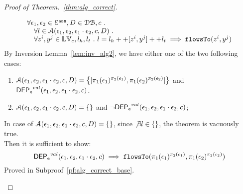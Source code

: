 \begin{proof}[Proof of Theorem.~\ref{thm:alg_correct}]
\begin{case}
\[\begin{array}{l}
  \forall \mathtt{\epsilon}_1, \mathtt{\epsilon}_2 \in \mathcal{E}^{\mathtt{{asn}}}, D \in \mathcal{DB} , c ~.~
  \\ \quad 
   \forall l \in \mathcal{A}( \mathtt{\epsilon}_1, \mathtt{\epsilon}_2,  \mathtt{\epsilon}_1 \cdot \mathtt{\epsilon}_2, c, D) ~.~
   \\ \quad 
   \forall z^i, y^j \in \mathbb{LV}_c, l_h, l_t ~.~ 
   l = l_h ++ [z^i, y^j] ++ l_t 
   \implies \mathtt{flowsTo}(z^i, y^j)
\end{array}
\]
%
By Inversion Lemma~\ref{lem:inv_alg2}, we have either one of the two following cases:
\begin{enumerate}
  \item $\mathcal{A}(\event_1, \event_2, \event_1 \cdot \event_2, c, D) = 
  \left\{[\pi_1(\event_1)^{\pi_2(\event_1)}, \pi_1(\event_2)^{\pi_2(\event_2)}] \right \}$ 
  and $\mathsf{DEP_{\mathtt{e}}}^{val}(\mathtt{\epsilon}_1, \mathtt{\epsilon}_2, \mathtt{\epsilon}_1 \cdot \mathtt{\epsilon}_2, c)$.
  \item  $\mathcal{A}(\mathtt{\epsilon}_1, \mathtt{\epsilon}_2, \mathtt{\epsilon}_1 \cdot \mathtt{\epsilon}_2, c, D) = \{\}$ 
  and $\neg \mathsf{DEP_{\mathtt{e}}}^{val}(\mathtt{\epsilon}_1, \mathtt{\epsilon}_2, \mathtt{\epsilon}_1 \cdot \mathtt{\epsilon}_2, c)$;
\end{enumerate}
%
In case of $\mathcal{A}(\mathtt{\epsilon}_1, \mathtt{\epsilon}_2, \mathtt{\epsilon}_1 \cdot \mathtt{\epsilon}_2, c, D) = \{\}$,
since $\not\exists l \in \{\}$, the theorem is vacuously true.
%
\\
Then it is sufficient to show:
%
\[
  \mathsf{DEP_{\mathtt{e}}}^{val}(\mathtt{\epsilon}_1, \mathtt{\epsilon}_2, \mathtt{\epsilon}_1 \cdot \mathtt{\epsilon}_2, c) \implies \mathtt{flowsTo}(\pi_1(\mathtt{\epsilon}_1)^{\pi_2(\mathtt{\epsilon}_1)}, \pi_1(\mathtt{\epsilon}_2)^{\pi_2(\mathtt{\epsilon}_2)})
\]
% 
Proved in Subproof~\ref{pf:alg_correct_base}.


\end{case}
\end{proof}

